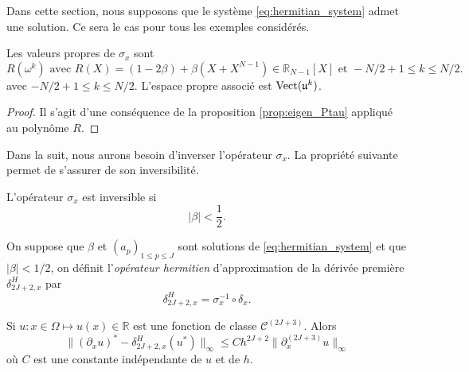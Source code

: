 Dans cette section, nous supposons que le système \eqref{eq:hermitian_system} admet une solution. Ce sera le cas pour tous les exemples considérés.

\begin{proposition}
Les valeurs propres de $\sigma_x$ sont
\begin{equation}
R(\omega^k) \text{ avec } R(X) = (1-2 \beta) + \beta(X+X^{N-1}) \in \mathbb{R}_{N-1}[X] \text{ et } -N/2+1 \leq k \leq N/2.
\end{equation}
avec $-N/2+1 \leq k \leq N/2$. L'espace propre associé est $\text{Vect} ( \mathfrak{u}^k )$.
\end{proposition}

\begin{proof}
Il s'agit d'une conséquence de la proposition \ref{prop:eigen_Ptau} appliqué au polynôme $R$.
\end{proof}
Dans la suit, nous aurons besoin d'inverser l'opérateur $\sigma_x$. La propriété suivante permet de s'assurer de son inversibilité.
\begin{corollaire}
L'opérateur $\sigma_x$ est inversible si
\begin{equation}
| \beta | < \dfrac{1}{2}.
\end{equation}
\end{corollaire}

\begin{definition}
On suppose que $\beta$ et $(a_p)_{1 \leq p \leq J}$ sont solutions de \eqref{eq:hermitian_system} et que $|\beta| < 1/2$, on définit l'\textit{opérateur hermitien} d'approximation de la dérivée première $\delta_{2J+2,x}^H$ par 
\begin{equation}
\delta_{2J+2,x}^H = \sigma_x^{-1} \circ \delta_{x}.
\end{equation}
\label{def:herder}
\end{definition}

\begin{theoreme}
Si $u : x \in \Omega \mapsto u(x) \in \mathbb{R}$ est une fonction de classe $\mathcal{C}^{(2J+3)}$.
Alors 
\begin{equation}
\| (\partial_x u)^* - \delta_{2J+2,x}^H (u^*) \|_{\infty} \leq C h^{2J+2} \| \partial_x^{(2J+3)} u \|_{\infty}
\end{equation}
où $C$ est une constante indépendante de $u$ et de $h$.
\label{th:consistence_herm2}
\end{theoreme}


